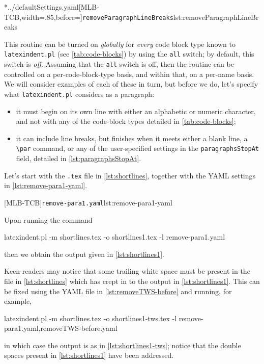 	\cmhlistingsfromfile[style=removeParagraphLineBreaks]*{../defaultSettings.yaml}[MLB-TCB,width=.85\linewidth,before=\centering]{\texttt{removeParagraphLineBreaks}}{lst:removeParagraphLineBreaks}

	This routine can be turned on \emph{globally} for \emph{every}
	code block type known to \texttt{latexindent.pl}
	(see \vref{tab:code-blocks}) by using the
	\texttt{all} switch; by default, this switch is
	\emph{off}. Assuming that the \texttt{all} switch is off,
	then the routine can be controlled on a per-code-block-type basis, and within that, on a
	per-name basis. We will consider examples of each of these in turn, but before we do,
	let's specify what \texttt{latexindent.pl} considers as a paragraph:
	\begin{itemize}
		\item it must begin on its own line with either an alphabetic or numeric character, and not
		      with any of the code-block types detailed in \vref{tab:code-blocks};
		\item it can include line breaks, but finishes when it meets either a blank line, a
		      \lstinline!\par! command, or any of the user-specified settings in the
		      \texttt{paragraphsStopAt} field, detailed in \vref{lst:paragraphsStopAt}.
	\end{itemize}

	Let's start with the \texttt{.tex} file in \cref{lst:shortlines},
	together with the YAML settings in \cref{lst:remove-para1-yaml}.

	\begin{cmhtcbraster}
		[MLB-TCB]{\texttt{remove-para1.yaml}}{lst:remove-para1-yaml}
	\end{cmhtcbraster}

	Upon running the command
	\begin{commandshell}
latexindent.pl -m shortlines.tex -o shortlines1.tex -l remove-para1.yaml
\end{commandshell}
	then we obtain the output given in \cref{lst:shortlines1}.


	Keen readers may notice that some trailing white space must be present in the file in
	\cref{lst:shortlines} which has crept in to the output in
	\cref{lst:shortlines1}. This can be fixed using the YAML file in
	\vref{lst:removeTWS-before} and running, for example,
	\begin{commandshell}
latexindent.pl -m shortlines.tex -o shortlines1-tws.tex -l remove-para1.yaml,removeTWS-before.yaml  
    \end{commandshell}
	in which case the output is as in \cref{lst:shortlines1-tws}; notice that the double
	spaces present in \cref{lst:shortlines1} have been addressed.

